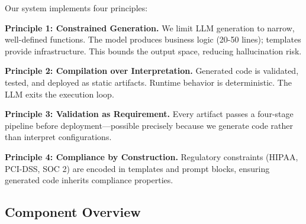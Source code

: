\documentclass[11pt]{article}
\begin{document}
Our system implements four principles:

\textbf{Principle 1: Constrained Generation.} We limit LLM generation to narrow, well-defined functions. The model produces business logic (20-50 lines); templates provide infrastructure. This bounds the output space, reducing hallucination risk.

\textbf{Principle 2: Compilation over Interpretation.} Generated code is validated, tested, and deployed as static artifacts. Runtime behavior is deterministic. The LLM exits the execution loop.

\textbf{Principle 3: Validation as Requirement.} Every artifact passes a four-stage pipeline before deployment—possible precisely because we generate code rather than interpret configurations.

\textbf{Principle 4: Compliance by Construction.} Regulatory constraints (HIPAA, PCI-DSS, SOC 2) are encoded in templates and prompt blocks, ensuring generated code inherits compliance properties.

\subsection{Component Overview}
\end{document}
